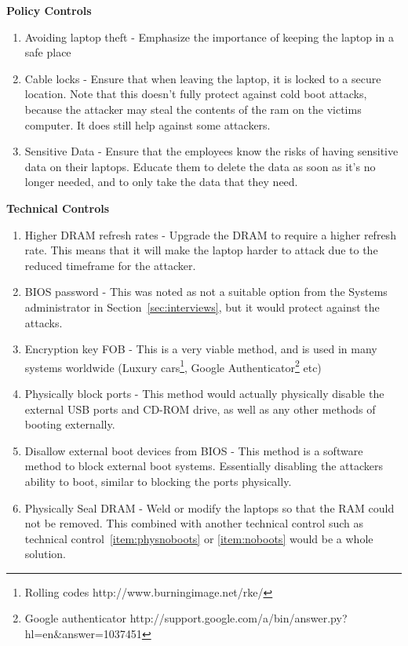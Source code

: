 \documentclass[paper=a4, fontsize=11pt]{scrartcl} %
\numberwithin{equation}{section} %
\numberwithin{figure}{section} %
\numberwithin{table}{section} %
\begin{document}
\textbf{Policy Controls}
\label{sec:controls}
	\begin{enumerate}
		\item Avoiding laptop theft - Emphasize the importance of keeping the laptop in a safe place
		\item Cable locks - Ensure that when leaving the laptop, it is locked to a secure location.  Note that this doesn't fully protect against cold boot attacks, because the attacker may steal the contents of the ram on the victims computer.  It does still help against some attackers.
		\item Sensitive Data - Ensure that the employees know the risks of having sensitive data on their laptops.  Educate them to delete the data as soon as it's no longer needed, and to only take the data that they need.
	\end{enumerate}
	\textbf{Technical Controls}
	\begin{enumerate}
		\item Higher DRAM refresh rates - Upgrade the DRAM to require a higher refresh rate.  This means that it will make the laptop harder to attack due to the reduced timeframe for the attacker.
		\item BIOS password - This was noted as not a suitable option from the Systems administrator in Section~\ref{sec:interviews}, but it would protect against the attacks.
		\item Encryption key FOB - This is a very viable method, and is used in many systems worldwide (Luxury cars\footnote{Rolling codes http://www.burningimage.net/rke/}, Google Authenticator\footnote{Google authenticator http://support.google.com/a/bin/answer.py?hl=en\&answer=1037451} etc)
		\item Physically block ports - This method would actually physically disable the external USB ports and CD-ROM drive, as well as any other methods of booting externally. \label{item:physnoboots}
		\item Disallow external boot devices from BIOS - This method is a software method to block external boot systems.  Essentially disabling the attackers ability to boot, similar to blocking the ports physically. \label{item:noboots}
		\item Physically Seal DRAM - Weld or modify the laptops so that the RAM could not be removed.    This combined with another technical control such as technical control~\ref{item:physnoboots} or \ref{item:noboots} would be a whole solution.
	\end{enumerate}
\end{document}
